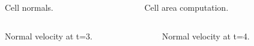 \documentclass[12pt]{beamer}
\begin{document}
\begin{frame}
\begin{columns}
	\begin{column}{0.5\textwidth}
		\begin{figure}
			\scalebox{0.8}{}
			\caption{\small Cell normals.} 
		\end{figure}
	\end{column}
	\begin{column}{0.5\textwidth}
		\begin{figure}
			\scalebox{0.8}{}
			\caption{Cell area computation.} 
		\end{figure}
	\end{column}
\end{columns}
\end{frame}

\begin{frame}
\begin{columns}
	\begin{column}{0.5\textwidth}
		\begin{figure}
			\scalebox{0.8}{}
			\caption{\small Normal velocity at t=3.} 
		\end{figure}
	\end{column}
	\begin{column}{0.5\textwidth}
		\begin{figure}
			\scalebox{0.8}{}
			\caption{Normal velocity at t=4.} 
		\end{figure}
	\end{column}
\end{columns}
\end{frame}
\end{document}
